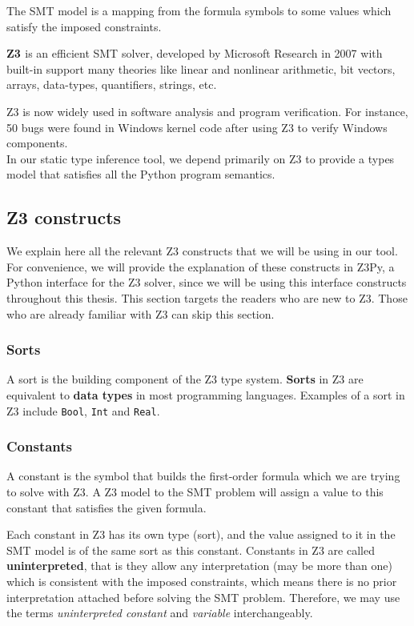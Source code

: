 The SMT model is a mapping from the formula symbols to some values which satisfy the imposed constraints.

\textbf{Z3 \cite{z3}} is an efficient SMT solver, developed by Microsoft Research in 2007 with built-in support many theories like linear and nonlinear arithmetic, bit vectors, arrays, data-types, quantifiers, strings, etc.

Z3 is now widely used in software analysis and program verification. For instance, 50 bugs were found in Windows kernel code after using Z3 to verify Windows components. \cite{expz3}\\

In our static type inference tool, we depend primarily on Z3 to provide a types model that satisfies all the Python program semantics.

\subsection{Z3 constructs}
We explain here all the relevant Z3 constructs that we will be using in our tool. For convenience, we will provide the explanation of these constructs in Z3Py, a Python interface for the Z3 solver, since we will be using this interface constructs throughout this thesis. This section targets the readers who are new to Z3. Those who are already familiar with Z3 can skip this section.

\subsubsection{Sorts}
A sort is the building component of the Z3 type system. \textbf{Sorts} in Z3 are equivalent to \textbf{data types} in most programming languages. Examples of a sort in Z3 include \lstinline|Bool|, \lstinline|Int| and \lstinline|Real|.

\subsubsection{Constants}
A constant is the symbol that builds the first-order formula which we are trying to solve with Z3. A Z3 model to the SMT problem will assign a value to this constant that satisfies the given formula.

Each constant in Z3 has its own type (sort), and the value assigned to it in the SMT model is of the same sort as this constant. Constants in Z3 are called \textbf{uninterpreted}, that is they allow any interpretation (may be more than one) which is consistent with the imposed constraints, which means there is no prior interpretation attached before solving the SMT problem. Therefore, we may use the terms \textit{uninterpreted constant} and \textit{variable} interchangeably. \\

